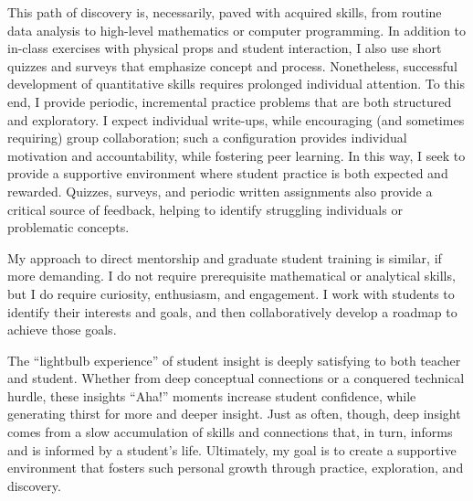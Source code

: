 \documentclass[12pt]{article}
\begin{document}
This path of discovery is, necessarily, paved 
with acquired skills, from routine data analysis to 
high-level mathematics or computer programming. 
In addition to in-class exercises with physical props 
and student interaction, I also use short quizzes and surveys 
that emphasize concept and process. Nonetheless, 
successful development of quantitative skills requires 
prolonged individual attention.  To this end, I 
provide periodic, incremental practice problems
that are both structured and exploratory.
I expect individual write-ups, while encouraging (and sometimes 
requiring) group collaboration; such a configuration provides 
individual motivation and accountability, while fostering
peer learning. In this way, I seek to provide a supportive 
environment where student practice is both expected and rewarded. 
Quizzes, surveys, and periodic written assignments
also provide a critical source of feedback, 
helping to identify struggling individuals or 
problematic concepts.

My approach to direct mentorship and graduate student
training is similar, if more demanding.  I do not 
require prerequisite mathematical or analytical skills,
but I do require curiosity, enthusiasm, and engagement.
I work with students to identify their interests 
and goals, and then collaboratively develop a roadmap 
to achieve those goals.

The ``lightbulb experience'' of student insight is 
deeply satisfying to both teacher and student. 
Whether from deep conceptual connections or a conquered
technical hurdle, these insights ``Aha!'' moments
increase student confidence, while generating thirst for more and 
deeper insight.  Just as often, though, deep insight comes 
from a slow accumulation of skills and connections that, 
in turn, informs and is informed by a student's life.  
Ultimately, my goal is to create a supportive environment 
that fosters such personal growth through practice, 
exploration, and discovery.
\end{document}
